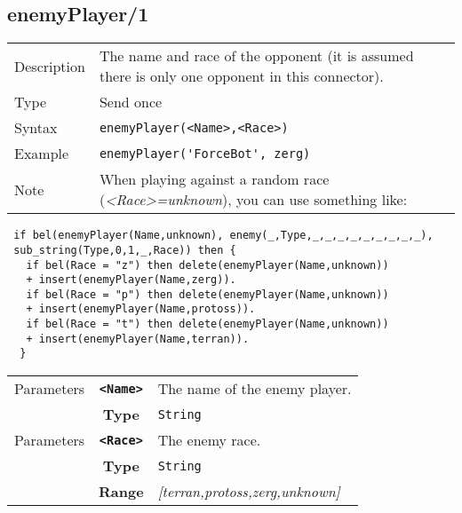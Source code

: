 \pagebreak

\subsection{enemyPlayer/1}
\begin{tabularx}{\textwidth}{lX}
 Description & The name and race of the opponent (it is assumed there is only one opponent in this connector). \\
 Type & Send once \\
 Syntax &  \verb|enemyPlayer(<Name>,<Race>)| \\
 Example & \verb|enemyPlayer('ForceBot', zerg)| \\
 Note & When playing against a random race (\textit{<Race>=unknown}), you can use something like:
 \end{tabularx}
 \begin{lstlisting}
 if bel(enemyPlayer(Name,unknown), enemy(_,Type,_,_,_,_,_,_,_,_,_),
 sub_string(Type,0,1,_,Race)) then {
   if bel(Race = "z") then delete(enemyPlayer(Name,unknown))
   + insert(enemyPlayer(Name,zerg)).
   if bel(Race = "p") then delete(enemyPlayer(Name,unknown))
   + insert(enemyPlayer(Name,protoss)).
   if bel(Race = "t") then delete(enemyPlayer(Name,unknown))
   + insert(enemyPlayer(Name,terran)).
  }
 \end{lstlisting}
 \begin{tabularx}{\textwidth}{l | c | p{8cm}|}
 \cline{2-3}
  Parameters & \textbf{\verb|<Name>|} & The name of the enemy player. \\
             & \textbf{Type} & \verb|String| \\
            \cline{2-3}
 \cline{2-3}
  Parameters & \textbf{\verb|<Race>|} & The enemy race. \\
             & \textbf{Type} & \verb|String| \\
             & \textbf{Range} & \textit{[terran,protoss,zerg,unknown]} \\
            \cline{2-3}
\end{tabularx}

